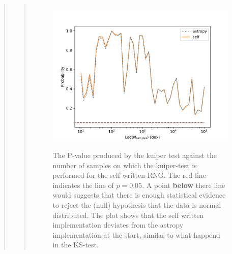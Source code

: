 \begin{quote}
\begin{quote}
\begin{figure}[!hb]
\centering
\includegraphics[width=12cm, height=7.5cm]{./Plots/1_plot_kuiper_test_self_astropy.pdf}
\caption{The P-value produced by the kuiper test against the number of samples on which the kuiper-test is performed for the self written RNG. The red line indicates the line of $ p = 0.05$. A point \textbf{below} there  line would suggests that there is enough statistical evidence to reject the (null) hypothesis that the data is normal distributed. The plot shows that the self written implementation deviates from the astropy implementation at the start, similar to what happend in the KS-test.   }
\end{figure}

\end{quote}



\end{quote}

\newpage

%

%


%
\newpage











